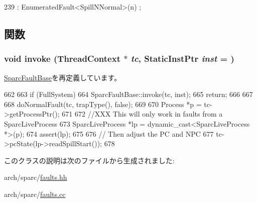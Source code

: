 \begin{DoxyCode}
239 : EnumeratedFault<SpillNNormal>(n) {;}
\end{DoxyCode}


\subsection{関数}
\hypertarget{classSparcISA_1_1SpillNNormal_a2bd783b42262278d41157d428e1f8d6f}{
\subsubsection[{invoke}]{\setlength{\rightskip}{0pt plus 5cm}void invoke ({\bf ThreadContext} $\ast$ {\em tc}, \/  {\bf StaticInstPtr} {\em inst} = {})}}
\label{classSparcISA_1_1SpillNNormal_a2bd783b42262278d41157d428e1f8d6f}


\hyperlink{classSparcISA_1_1SparcFaultBase_a2bd783b42262278d41157d428e1f8d6f}{SparcFaultBase}を再定義しています。


\begin{DoxyCode}
662 {
663     if (FullSystem) {
664         SparcFaultBase::invoke(tc, inst);
665         return;
666     }
667 
668     doNormalFault(tc, trapType(), false);
669 
670     Process *p = tc->getProcessPtr();
671 
672     //XXX This will only work in faults from a SparcLiveProcess
673     SparcLiveProcess *lp = dynamic_cast<SparcLiveProcess *>(p);
674     assert(lp);
675 
676     // Then adjust the PC and NPC
677     tc->pcState(lp->readSpillStart());
678 }
\end{DoxyCode}


このクラスの説明は次のファイルから生成されました:\begin{DoxyCompactItemize}
\item 
arch/sparc/\hyperlink{arch_2sparc_2faults_8hh}{faults.hh}\item 
arch/sparc/\hyperlink{arch_2sparc_2faults_8cc}{faults.cc}\end{DoxyCompactItemize}
